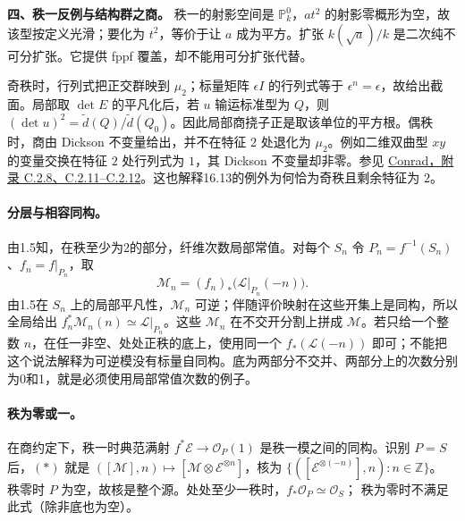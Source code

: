 \medskip
\noindent\textbf{四、秩一反例与结构群之商。}
秩一的射影空间是 $\mathbb P^0_k$，$at^2$ 的射影零概形为空，故该型按定义光滑；要化为 $t^2$，等价于让 $a$ 成为平方。扩张 $k(\sqrt a)/k$ 是二次纯不可分扩张。它提供 fppf 覆盖，却不能用可分扩张代替。
\par
奇秩时，行列式把正交群映到 $\mu_2$；标量矩阵 $\epsilon I$ 的行列式等于 $\epsilon^n=\epsilon$，故给出截面。局部取 $\det E$ 的平凡化后，若 $u$ 输运标准型为 $Q$，则 $(\det u)^2=\widetilde d(Q)/\widetilde d(Q_0)$。因此局部商挠子正是取该单位的平方根。偶秩时，商由 Dickson 不变量给出，并不在特征 $2$ 处退化为 $\mu_2$。例如二维双曲型 $xy$ 的变量交换在特征 $2$ 处行列式为 $1$，其 Dickson 不变量却非零。参见 \href{https://math.stanford.edu/~conrad/papers/luminysga3.pdf}{Conrad，附录 C.2.8、C.2.11--C.2.12}。这也解释16.13的例外为何恰为奇秩且剩余特征为 $2$。
\par\endgroup

\begingroup
\def\OO{\mathcal O}
\def\LL{\mathcal L}
\def\MM{\mathcal M}
\def\EE{\mathcal E}
\def\Pic{\operatorname{Pic}}
\def\Sym{\operatorname{Sym}}
\def\Proj{\operatorname{Proj}}
\def\Spec{\operatorname{Spec}}
\def\Hom{\operatorname{Hom}}
\hypertarget{audit:L18-073}{}
\paragraph{分层与相容同构。}
由1.5知，在秩至少为2的部分，纤维次数局部常值。对每个 \(S_n\) 令 \(P_n=f^{-1}(S_n)\)、\(f_n=f|_{P_n}\)，取
\[
\MM_n=(f_n)_*\bigl(\LL|_{P_n}(-n)\bigr).
\]
由1.5在 \(S_n\) 上的局部平凡性，\(\MM_n\) 可逆；伴随评价映射在这些开集上是同构，所以全局给出 \(f_n^*\MM_n(n)\simeq\LL|_{P_n}\)。这些 \(\MM_n\) 在不交开分割上拼成 \(\MM\)。若只给一个整数 \(n\)，在任一非空、处处正秩的底上，使用同一个 \(f_*(\LL(-n))\) 即可；不能把这个说法解释为可逆模没有标量自同构。底为两部分不交并、两部分上的次数分别为0和1，就是必须使用局部常值次数的例子。

\paragraph{秩为零或一。}
在商约定下，秩一时典范满射 \(f^*\EE\to\OO_P(1)\) 是秩一模之间的同构。识别 \(P=S\) 后，\((*)\) 就是
\(([\MM],n)\mapsto[\MM\otimes\EE^{\otimes n}]\)，核为
\(\{([\EE^{\otimes(-n)}],n):n\in\mathbb Z\}\)。
秩零时 \(P\) 为空，故核是整个源。处处至少一秩时，\(f_*\OO_P\simeq\OO_S\)； 秩为零时不满足此式（除非底也为空）。

